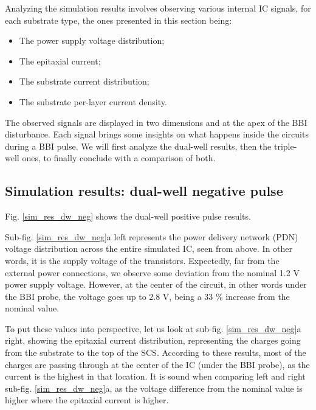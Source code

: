 	Analyzing the simulation results involves observing various internal IC signals, for each substrate type, the ones presented in this section being:
	\begin{itemize}
		\item The power supply voltage distribution;
		\item The epitaxial current;
		\item The substrate current distribution;
		\item The substrate per-layer current density.
	\end{itemize}
	The observed signals are displayed in two dimensions and at the apex of the BBI disturbance.
	Each signal brings some insights on what happens inside the circuits during a BBI pulse.
	We will first analyze the dual-well results, then the triple-well ones, to finally conclude with a comparison of both.
	
	\subsection{Simulation results: dual-well negative pulse}
		Fig. \ref{sim_res_dw_neg} shows the dual-well positive pulse results.

		Sub-fig. \ref{sim_res_dw_neg}a left represents the power delivery network (PDN) voltage distribution across the entire simulated IC, seen from above.
		In other words, it is the supply voltage of the transistors.
		Expectedly, far from the external power connections, we observe some deviation from the nominal 1.2 V power supply voltage.
		However, at the center of the circuit, in other words under the BBI probe, the voltage goes up to 2.8 V, being a 33 \% increase from the nominal value.

		To put these values into perspective, let us look at sub-fig. \ref{sim_res_dw_neg}a right, showing the epitaxial current distribution, representing the charges going from the substrate to the top of the SCS.
		According to these results, most of the charges are passing through at the center of the IC (under the BBI probe), as the current is the highest in that location.
		It is sound when comparing left and right sub-fig. \ref{sim_res_dw_neg}a, as the voltage difference from the nominal value is higher where the epitaxial current is higher.

